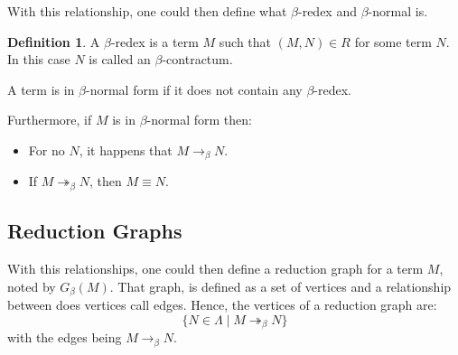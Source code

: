 \documentclass[11pt]{article}
\theoremstyle{definition}
\newtheorem{definition}{Definition}[section]
\theoremstyle{remark}
\theoremstyle{remark}
\theoremstyle{definition}
\begin{document}
With this relationship, one could then define what $\beta$-redex and
$\beta$-normal is.

\begin{definition}
  A $\beta$-redex is a term $M$ such that $(M, N) \in R$ for some term $N$. In
  this case $N$ is called an $\beta$-contractum.

  A term is in $\beta$-normal form if it does not contain any $\beta$-redex.

  Furthermore, if $M$ is in $\beta$-normal form then:
  \begin{itemize}
    \item For no $N$, it happens that $M \rightarrow_\beta N$.
    \item If $M \twoheadrightarrow_\beta N$, then $M \equiv N$.
  \end{itemize}
\end{definition}


\subsection{Reduction Graphs}
With this relationships, one could then define a reduction graph for a term $M$,
noted by $G_\beta(M)$. That graph, is defined as a set of vertices and a
relationship between does vertices call edges. Hence, the vertices of a
reduction graph are:
%
\begin{equation*}
  \{N \in \Lambda \mid M \twoheadrightarrow_\beta N\}
\end{equation*}
%
with the edges being $M \rightarrow_\beta N$.
\end{document}
